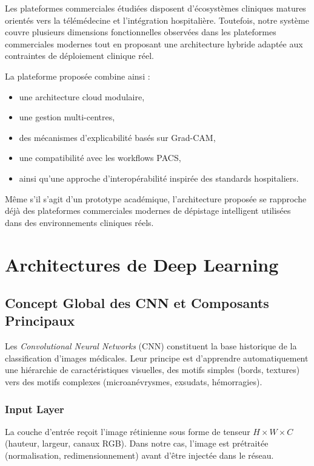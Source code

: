 \documentclass[12pt,a4paper,oneside]{report}
\begin{document}
Les plateformes commerciales étudiées disposent d'écosystèmes cliniques
matures orientés vers la télémédecine et l'intégration hospitalière. Toutefois,
notre système couvre plusieurs dimensions fonctionnelles observées dans les
plateformes commerciales modernes tout en proposant une architecture hybride
adaptée aux contraintes de déploiement clinique réel.

La plateforme proposée combine ainsi :
\begin{itemize}
    \item une architecture cloud modulaire,
    \item une gestion multi-centres,
    \item des mécanismes d'explicabilité basés sur Grad-CAM,
    \item une compatibilité avec les workflows PACS,
    \item ainsi qu'une approche d'interopérabilité inspirée des standards hospitaliers.
\end{itemize}

Même s'il s'agit d'un prototype académique, l'architecture proposée se rapproche
déjà des plateformes commerciales modernes de dépistage intelligent utilisées
dans des environnements cliniques réels.

\section{Architectures de Deep Learning}

\subsection{Concept Global des CNN et Composants Principaux}

Les \textit{Convolutional Neural Networks} (CNN) constituent la base
historique de la classification d'images médicales. Leur principe est
d'apprendre automatiquement une hiérarchie de caractéristiques visuelles,
des motifs simples (bords, textures) vers des motifs complexes
(microanévrysmes, exsudats, hémorragies).

\subsubsection{Input Layer}

La couche d'entrée reçoit l'image rétinienne sous forme de tenseur
$H \times W \times C$ (hauteur, largeur, canaux RGB). Dans notre cas,
l'image est prétraitée (normalisation, redimensionnement) avant d'être
injectée dans le réseau.
\end{document}

